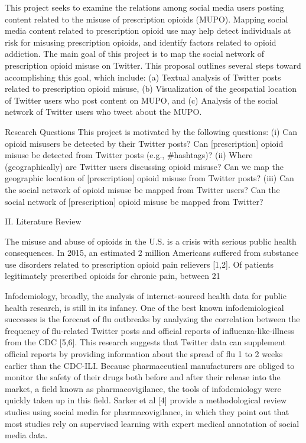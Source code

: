 \documentclass[sigconf]{acmart}
\begin{document}
This project seeks to examine the relations among social media users posting content related to the misuse of prescription opioids (MUPO). Mapping social media content related to prescription opioid use may help detect individuals at risk for misusing prescription opioids, and identify factors related to opioid addiction. The main goal of this project is to map the social network of prescription opioid misuse on Twitter. This proposal outlines several steps toward accomplishing this goal, which include: (a) Textual analysis of Twitter posts related to prescription opioid misuse, (b) Visualization of the geospatial location of Twitter users who post content on MUPO, and (c) Analysis of the social network of Twitter users who tweet about the MUPO. 

Research Questions 
This project is motivated by the following questions: 
(i) Can opioid misusers be detected by their Twitter posts? 
Can [prescription] opioid misuse be detected from Twitter posts (e.g., #hashtags)? 
(ii) Where (geographically) are Twitter users discussing opioid misuse? 
Can we map the geographic location of [prescription] opioid misuse from Twitter posts? 
(iii) Can the social network of opioid misuse be mapped from Twitter users? 
Can the social network of [prescription] opioid misuse be mapped from Twitter? 

II. Literature Review 

The misuse and abuse of opioids in the U.S. is a crisis with serious public health consequences. In 2015, an estimated 2 million Americans suffered from substance use disorders related to prescription opioid pain relievers [1,2]. Of patients legitimately prescribed opioids for chronic pain, between 21%

Infodemiology, broadly, the analysis of internet-sourced health data for public health research, is still in its infancy. One of the best known infodemiological successes is the forecast of flu outbreaks by analyzing the correlation between the frequency of flu-related Twitter posts and official reports of influenza-like-illness from the CDC [5,6]. This research suggests that Twitter data can supplement official reports by providing information about the spread of flu 1 to 2 weeks earlier than the CDC-ILI. Because pharmaceutical manufacturers are obliged to monitor the safety of their drugs both before and after their release into the market, a field known as pharmacovigilance, the tools of infodemiology were quickly taken up in this field. Sarker et al [4] provide a methodological review studies using social media for pharmacovigilance, in which they point out that most studies rely on supervised learning with expert medical annotation of social media data. 
\end{document}
